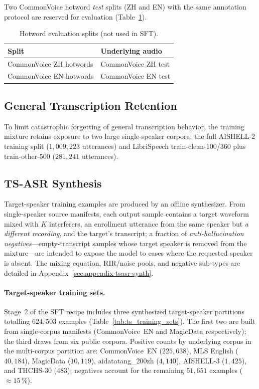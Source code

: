 Two CommonVoice hotword \emph{test} splits (ZH and EN) with the same
annotation protocol are reserved for evaluation
(Table~\ref{tab:data_hotwords_eval}).

\begin{table}[t]
  \caption{Hotword evaluation splits (not used in SFT).}
  \label{tab:data_hotwords_eval}
  \centering
  \small
  \begin{tabular}{ll}
    \toprule
    Split & Underlying audio \\
    \midrule
    CommonVoice ZH hotwords & CommonVoice ZH test \\
    CommonVoice EN hotwords & CommonVoice EN test \\
    \bottomrule
  \end{tabular}
\end{table}

\subsection{General Transcription Retention}
\label{subsec:general-asr-retention}

To limit catastrophic forgetting of general transcription behavior, the
training mixture retains exposure to two large single-speaker corpora:
the full AISHELL-2 training split ($1{,}009{,}223$ utterances) and
LibriSpeech train-clean-100/360 plus train-other-500 ($281{,}241$
utterances).

\subsection{TS-ASR Synthesis}
\label{subsec:tsasr-synth}

Target-speaker training examples are produced by an offline
synthesizer. From single-speaker source manifests, each output sample
contains a target waveform mixed with $K$ interferers, an enrollment
utterance from the same speaker but \emph{a different recording}, and
the target's transcript; a fraction of \emph{anti-hallucination
negatives}---empty-transcript samples whose target speaker is removed
from the mixture---are intended to expose the model to cases where the
requested speaker is absent. The mixing equation, RIR/noise pools, and negative
sub-types are detailed in Appendix~\ref{sec:appendix-tsasr-synth}.

\paragraph{Target-speaker training sets.}
Stage~2 of the SFT recipe includes three synthesized
target-speaker partitions totalling $624{,}503$ examples
(Table~\ref{tab:ts_training_sets}).
The first two are built from single-corpus manifests (CommonVoice~EN
and MagicData respectively); the third draws from six public corpora.
Positive counts by underlying corpus in the multi-corpus partition
are: CommonVoice~EN ($225{,}638$), MLS English ($40{,}184$), MagicData
($10{,}119$), aidatatang\_200zh ($4{,}140$), AISHELL-3 ($1{,}425$),
and THCHS-30 ($483$); negatives account for the remaining
$51{,}651$ examples ($\approx\!15$\,\%).

